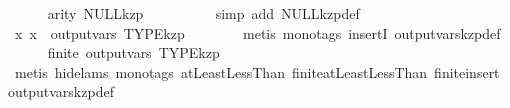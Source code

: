 \begin{isabellebody}
\isanewline
\ \ \ \ \isamarkupfalse%
\ {}arity\ {}NULL{}{}kzp{}\ {}\ {}{}\isanewline
\ \ \ \ \ \ \isamarkupfalse%
\ {}simp\ add{}\ NULL{}kzp{}def{}\isanewline
\isanewline
\ \ \ \ \isamarkupfalse%
\ {}{}x{}\ x\ {}\ output{}vars\ TYPE{}kzp{}{}\isanewline
\ \ \ \ \ \ \isamarkupfalse%
\ {}metis\ {}mono{}tags{}\ insertI{}\ output{}vars{}kzp{}def{}\isanewline
\isanewline
\ \ \ \ \isamarkupfalse%
\ {}finite\ {}output{}vars\ TYPE{}kzp{}{}{}\isanewline
\ \ \ \ \ \ \isamarkupfalse%
\ {}metis\ {}hide{}lams{}\ mono{}tags{}\ atLeastLessThan{}\ finite{}atLeastLessThan\ finite{}insert\ output{}vars{}kzp{}def{}\isanewline
\ \ \isamarkupfalse%
%
\endisatagproof
{\isafoldproof}%
%
\isadelimproof
%
\endisadelimproof
\isanewline
{}\isamarkupfalse%
\isanewline
\isanewline
{}\isamarkupfalse%

\end{isabellebody}
